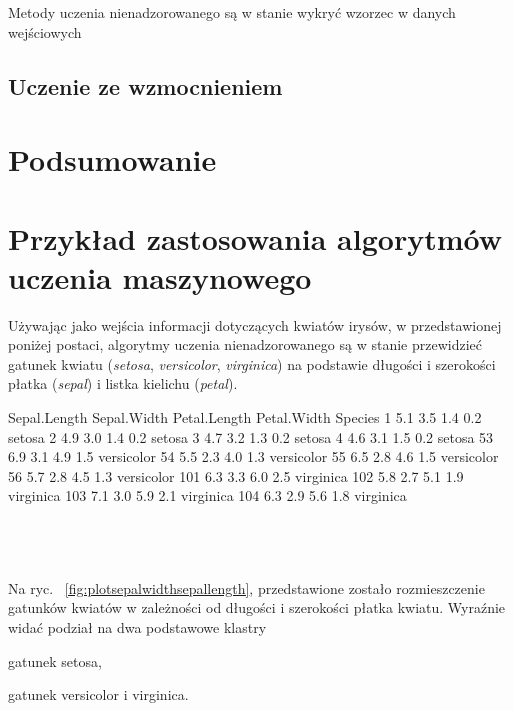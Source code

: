 Metody uczenia nienadzorowanego są w stanie wykryć wzorzec w danych wejściowych


\subsection{Uczenie ze wzmocnieniem}
\label{subsec:uczeniezewzmocnieniem}




\section{Podsumowanie}


\section{Przykład zastosowania algorytmów uczenia maszynowego}
\label{sec:przykladzastosowaniaalgorytmowuczeniamaszynowego}

Używając jako wejścia informacji dotyczących kwiatów irysów, w przedstawionej poniżej postaci, algorytmy uczenia 
nienadzorowanego są w stanie przewidzieć gatunek kwiatu (\textit{setosa}, \textit{versicolor},  \textit{virginica}) na 
podstawie długości i szerokości płatka  (\textit{sepal}) i listka kielichu (\textit{petal}).

\begin{code}[caption=Przykład danych dotyczących kwiatów irysów, label=amb, captionpos=b, belowcaptionskip=4pt]
    Sepal.Length Sepal.Width Petal.Length Petal.Width    Species
1            5.1         3.5          1.4         0.2     setosa
2            4.9         3.0          1.4         0.2     setosa
3            4.7         3.2          1.3         0.2     setosa
4            4.6         3.1          1.5         0.2     setosa
53           6.9         3.1          4.9         1.5 versicolor
54           5.5         2.3          4.0         1.3 versicolor
55           6.5         2.8          4.6         1.5 versicolor
56           5.7         2.8          4.5         1.3 versicolor
101          6.3         3.3          6.0         2.5  virginica
102          5.8         2.7          5.1         1.9  virginica
103          7.1         3.0          5.9         2.1  virginica
104          6.3         2.9          5.6         1.8  virginica
\end{code}
\\\\\\
Na ryc. ~\ref{fig:plotsepalwidthsepallength}, przedstawione zostało rozmieszczenie gatunków kwiatów w zależności od 
długości i szerokości płatka kwiatu. Wyraźnie widać podział na dwa podstawowe klastry
\begin{itemize*} 
\renewcommand{\labelitemi}{$\bullet$}
 \item gatunek setosa,
 \item gatunek versicolor i virginica.
\end{itemize*}

